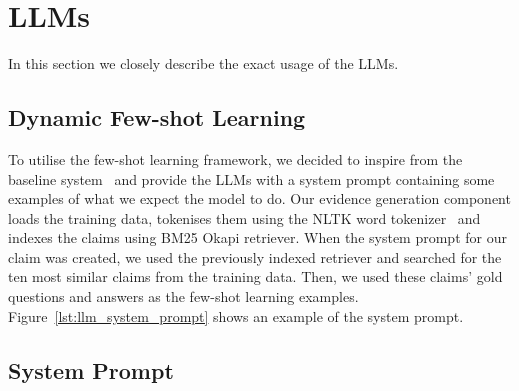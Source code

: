 
\section{LLMs}
\label{appendix_sec:llms}

In this section we closely describe the exact usage of the LLMs.

\subsection{Dynamic Few-shot Learning}
To utilise the few-shot learning framework, we decided to inspire from the baseline system~\cite{averitec2024} and provide the LLMs with a system prompt containing some examples of what we expect the model to do. Our evidence generation component loads the training data, tokenises them using the NLTK word tokenizer~\cite{bird-loper-2004-nltk} and indexes the claims using BM25 Okapi retriever. When the system prompt for our claim was created, we used the previously indexed retriever and searched for the ten most similar claims from the training data. Then, we used these claims' gold questions and answers as the few-shot learning examples. Figure~\ref{lst:llm_system_prompt} shows an example of the system prompt.


\subsection{System Prompt}



